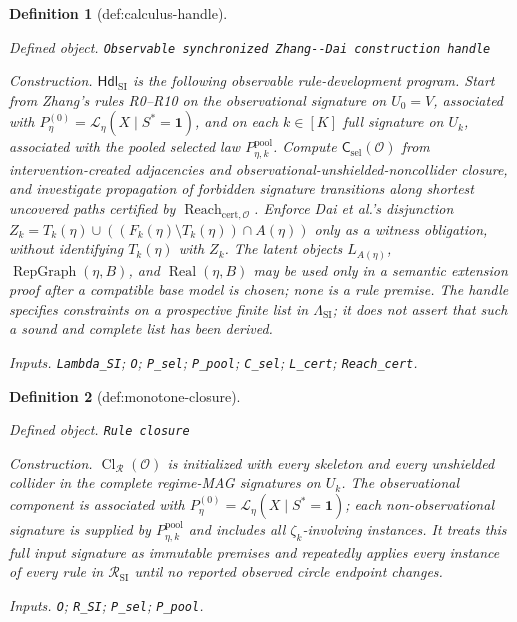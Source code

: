 \documentclass{article}
\newtheorem{definition}{Definition}
\begin{document}
\begin{definition}[def:calculus-handle]\label{def:calculus-handle}
\par\smallskip\noindent\emph{Defined object.} \texttt{Observable synchronized Zhang-\allowbreak{}-\allowbreak{}Dai construction handle}
\par\smallskip\noindent\emph{Construction.} \(\mathsf{Hdl}_{\mathrm{SI}}\) is the following observable rule-development program. Start from Zhang's rules R0--R10 on the observational signature on \(U_0=V\), associated with \(P_{\eta}^{(0)}=\mathcal L_\eta(X\mid S^*=\mathbf 1)\), and on each \(k\in[K]\) full signature on \(U_k\), associated with the pooled selected law \(P_{\eta,k}^{\mathrm{pool}}\). Compute \(\mathsf C_{\mathrm{sel}}(\mathcal O)\) from intervention-created adjacencies and observational-unshielded-noncollider closure, and investigate propagation of forbidden signature transitions along shortest uncovered paths certified by \(\operatorname{Reach}_{\mathrm{cert},\mathcal O}\). Enforce Dai et al.'s disjunction \(Z_k=T_k(\eta)\cup((F_k(\eta)\setminus T_k(\eta))\cap A(\eta))\) only as a witness obligation, without identifying \(T_k(\eta)\) with \(Z_k\). The latent objects \(L_{A(\eta)}\), \(\operatorname{RepGraph}(\eta,B)\), and \(\operatorname{Real}(\eta,B)\) may be used only in a semantic extension proof after a compatible base model is chosen; none is a rule premise. The handle specifies constraints on a prospective finite list in \(\Lambda_{\mathrm{SI}}\); it does not assert that such a sound and complete list has been derived.
\par\smallskip\noindent\emph{Inputs.} \texttt{Lambda\_\allowbreak{}SI}; \texttt{O}; \texttt{P\_\allowbreak{}sel}; \texttt{P\_\allowbreak{}pool}; \texttt{C\_\allowbreak{}sel}; \texttt{L\_\allowbreak{}cert}; \texttt{Reach\_\allowbreak{}cert}.
\end{definition}

\begin{definition}[def:monotone-closure]\label{def:monotone-closure}
\par\smallskip\noindent\emph{Defined object.} \texttt{Rule closure}
\par\smallskip\noindent\emph{Construction.} \(\operatorname{Cl}_{\mathcal R}(\mathcal O)\) is initialized with every skeleton and every unshielded collider in the complete regime-MAG signatures on \(U_k\). The observational component is associated with \(P_{\eta}^{(0)}=\mathcal L_{\eta}(X\mid S^*=\mathbf 1)\); each non-observational signature is supplied by \(P_{\eta,k}^{\mathrm{pool}}\) and includes all \(\zeta_k\)-involving instances. It treats this full input signature as immutable premises and repeatedly applies every instance of every rule in \(\mathcal R_{\mathrm{SI}}\) until no reported observed circle endpoint changes.
\par\smallskip\noindent\emph{Inputs.} \texttt{O}; \texttt{R\_\allowbreak{}SI}; \texttt{P\_\allowbreak{}sel}; \texttt{P\_\allowbreak{}pool}.
\end{definition}
\end{document}
